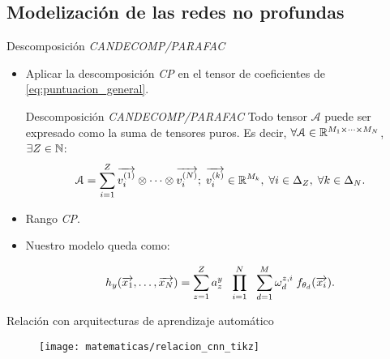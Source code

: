 \subsection{Modelización de las redes no profundas}
\begin{frame}{Descomposición \textit{CANDECOMP/PARAFAC}}
	\begin{itemize}
		\item Aplicar la descomposición \textit{CP} en el tensor de coeficientes de \eqref{eq:puntuacion_general}.

		      \begin{block}{Descomposición \textit{CANDECOMP/PARAFAC}}
			      Todo tensor $\mathcal{A}$ puede ser expresado como la suma de tensores puros. Es decir, $\forall \mathcal{A} \in \mathbb{R}^{M_1 \times \cdots \times M_N}$, $\exists Z \in \mathbb{N}$:
			      \begin{equation}
				      \mathcal{A} = \sum_{i = 1}^Z \overrightarrow{v_i^{(1)}} \otimes \cdots \otimes \overrightarrow{v_i^{(N)}};
				      \; \overrightarrow{v_i^{(k)}} \in \mathbb{R}^{M_k},
				      \; \forall i \in \Delta_{Z},
				      \; \forall k \in \Delta_{N}.
			      \end{equation}
		      \end{block}
		\item Rango \textit{CP}.
		\item Nuestro modelo queda como:

		      \begin{equation} \label{eq:cp_model}
			      h_y(\overrightarrow{x_1}, \ldots, \overrightarrow{x_N}) =  \sum_{z = 1}^Z a_z^y \ \  \prod_{i = 1}^N \ \  \sum_{d = 1}^{M} \omega^{z, i}_d \; f_{\theta_{d}}(\overrightarrow{x_i}).
		      \end{equation}

	\end{itemize}
\end{frame}

\begin{frame}{Relación con arquitecturas de aprendizaje automático}
	\begin{figure}
		\centering
		\texttt{[image: matematicas/relacion\_cnn\_tikz]}
	\end{figure}

\end{frame}



